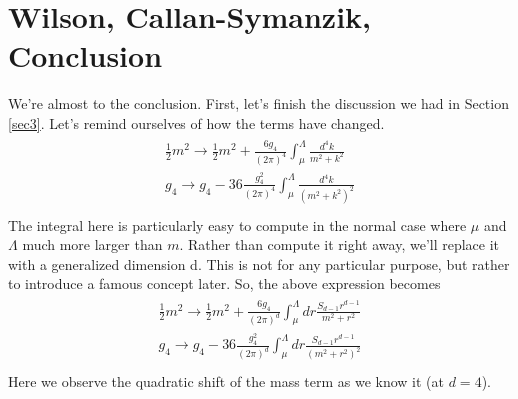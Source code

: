 \documentclass[12pt,halfline,a4paper]{ouparticle}
\begin{document}
\section{Wilson, Callan-Symanzik, Conclusion}
We're almost to the conclusion. First, let's finish the discussion we had in Section \ref{sec3}.
Let's remind ourselves of how the terms have changed. 
\begin{align}
\begin{split}
	\frac{1}{2}m^2\rightarrow\frac{1}{2} m^2+\frac{6g_4}{(2\pi)^4}\int^\Lambda_\mu\frac{d^4k}{m^2+k^2}\\
	g_4\rightarrow g_4-36\frac{g_4^2}{(2\pi)^4 }\int^\Lambda_\mu\frac{d^4k}{(m^2+k^2)^2}\\
\end{split}	
\end{align}
The integral here is particularly easy to compute in the normal case where $\mu$ and $\Lambda$ much more larger than $m$. Rather than compute it right away, we'll replace it with a generalized dimension d. This is not for any particular purpose, but rather to introduce a famous concept later. So, the above expression becomes
\begin{align}
	\begin{split}
		\frac{1}{2}m^2\rightarrow\frac{1}{2} m^2+\frac{6g_4}{(2\pi)^d}\int^\Lambda_\mu dr\frac{S_{d-1}r^{d-1}}{m^2+r^2}\\
		g_4\rightarrow g_4-36\frac{g_4^2}{(2\pi)^d}\int^\Lambda_\mu dr\frac{S_{d-1}r^{d-1}}{(m^2+r^2)^2}\\
	\end{split}	
\end{align}
Here we observe the quadratic shift of the mass term as we know it (at $d=4$).
\end{document}
